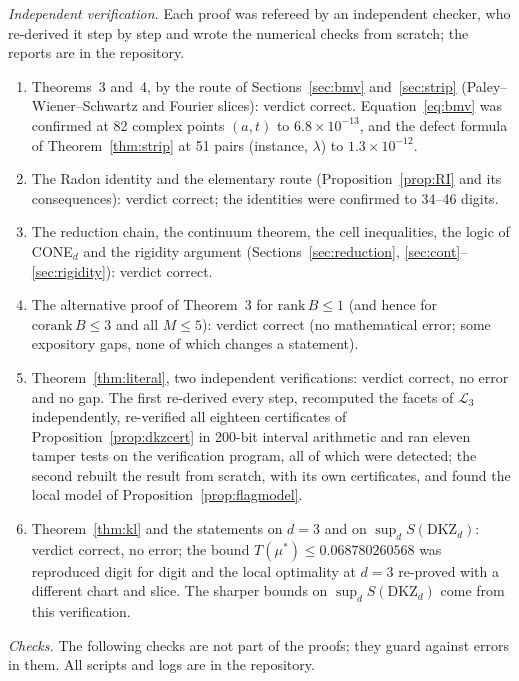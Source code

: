 \documentclass[11pt]{amsart}
\theoremstyle{definition}
\theoremstyle{remark}
\numberwithin{equation}{section}
\newcommand{\cL}{\mathcal{L}}
\newcommand{\DKZ}{\mathrm{DKZ}}
\begin{document}
\emph{Independent verification.} Each proof was refereed by an independent checker, who re-derived it step by step and
wrote the numerical checks from scratch; the reports are in the repository\cite{repoOQP}.
\begin{enumerate}
\item Theorems~3 and~4, by the route of Sections~\ref{sec:bmv} and~\ref{sec:strip} (Paley--Wiener--Schwartz and
Fourier slices): verdict correct. Equation~\eqref{eq:bmv} was confirmed at 82 complex points $(a,t)$ to
$6.8\times10^{-13}$, and the defect formula of Theorem~\ref{thm:strip} at 51 pairs (instance, $\lambda$) to
$1.3\times10^{-12}$.
\item The Radon identity and the elementary route (Proposition~\ref{prop:RI} and its consequences): verdict correct;
the identities were confirmed to 34--46 digits.
\item The reduction chain, the continuum theorem, the cell inequalities, the logic of CONE$_d$ and the rigidity
argument (Sections~\ref{sec:reduction}, \ref{sec:cont}--\ref{sec:rigidity}): verdict correct.
\item The alternative proof of Theorem~3 for $\mathrm{rank}\,B\le1$ (and hence for $\mathrm{corank}\,B\le3$ and all
$M\le5$): verdict correct (no mathematical error; some expository gaps, none of which changes a
statement).
\item Theorem~\ref{thm:literal}, two independent verifications: verdict correct, no error and no gap. The first
re-derived every step, recomputed the facets of $\cL_3$ independently, re-verified all eighteen certificates of
Proposition~\ref{prop:dkzcert} in 200-bit interval arithmetic and ran eleven tamper tests on the verification program,
all of which were detected; the second rebuilt the result from scratch, with its own certificates, and found the local
model of Proposition~\ref{prop:flagmodel}.
\item Theorem~\ref{thm:kl} and the statements on $d=3$ and on $\sup_dS(\DKZ_d)$: verdict correct, no error; the bound
$T(\mu^*)\le0.068780260568$ was reproduced digit for digit and the local optimality at $d=3$ re-proved with a different
chart and slice. The sharper bounds on $\sup_dS(\DKZ_d)$ come from this verification.
\end{enumerate}

\emph{Checks.} The following checks are not part of the proofs; they guard against errors in them. All scripts and
logs are in the repository\cite{repoOQP}.
\end{document}
